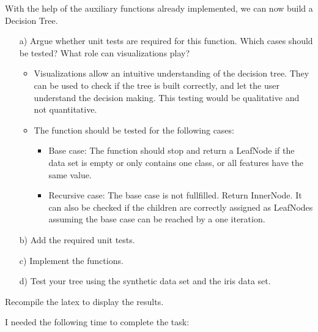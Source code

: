 \documentclass{article}
\begin{document}
With the help of the auxiliary functions already implemented, we can now build a Decision Tree. 

\begin{enumerate}

\item[a)] Argue whether unit tests are required for this function. Which cases should be tested? What role can visualizations play?
\begin{itemize}
    \item Visualizations allow an intuitive understanding of the decision tree. They can be used to check if the tree is built correctly, and let the user understand the decision making. This testing would be qualitative and not quantitative.
    \item The function should be tested for the following cases:
    \begin{itemize}
        \item Base case: The function should stop and return a LeafNode if the data set is empty or only contains one class, or all features have the same value. 
        \item Recursive case: The base case is not fullfilled. Return InnerNode. It can also be checked if the children are correctly assigned as LeafNodes assuming the base case can be reached by a one iteration.
    \end{itemize}
\end{itemize}

\item[b)] Add the required unit tests.

\item[c)] Implement the functions.

\item[d)] Test your tree using the synthetic data set and the iris data set.

\end{enumerate}

Recompile the latex to display the results.

I needed the following time to complete the task:
\end{document}
